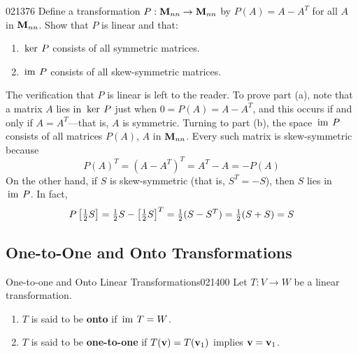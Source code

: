 \begin{example}{}{021376}
Define a transformation $P : \textbf{M}_{nn} \to \textbf{M}_{nn}$ by $P(A) = A - A^{T}$ for all $A$ in $\textbf{M}_{nn}$. Show that $P$ is linear and that:
\begin{enumerate}[label={\alph*.}]
\item $\thinspace\operatorname{ker \medspace}P$ consists of all symmetric matrices.

\item $\thinspace\operatorname{im \medspace}P$ consists of all skew-symmetric matrices.

\end{enumerate}

\begin{solution}
  The verification that $P$ is linear is left to the reader. To prove part (a), note that a matrix $A$ lies in $\thinspace\operatorname{ker \medspace}P$ just when $0 = P(A) = A - A^{T}$, and this occurs if and only if $A = A^{T}$---that is, $A$ is symmetric. Turning to part (b), the space $\thinspace\operatorname{im \medspace}P$ consists of all matrices $P(A)$, $A$ in $\textbf{M}_{nn}$. Every such matrix is skew-symmetric because
\begin{equation*}
P(A)^T = (A - A^T)^T = A^T - A = -P(A)
\end{equation*}
On the other hand, if $S$ is skew-symmetric (that is, $S^{T} = -S$), then $S$ lies in $\thinspace\operatorname{im \medspace}P$. In fact,
\begin{equation*}
P\left[ \tfrac{1}{2}S\right] = \tfrac{1}{2}S - \left[ \tfrac{1}{2}S\right]^T = \tfrac{1}{2}(S - S^T) = \tfrac{1}{2}(S + S) = S
\end{equation*}
\end{solution}
\end{example}

\subsection*{One-to-One and Onto Transformations}


\begin{definition}{One-to-one and Onto Linear Transformations}{021400}
Let $T : V \to W$ be a linear transformation.


\begin{enumerate}
\item $T$ is said to be \textbf{onto} if $\thinspace\operatorname{im \medspace}T = W$.

\item $T$ is said to be \textbf{one-to-one} if $T(\textbf{v}) = T(\textbf{v}_{1})$ implies $\textbf{v} = \textbf{v}_{1}$.

\end{enumerate}
\end{definition}

